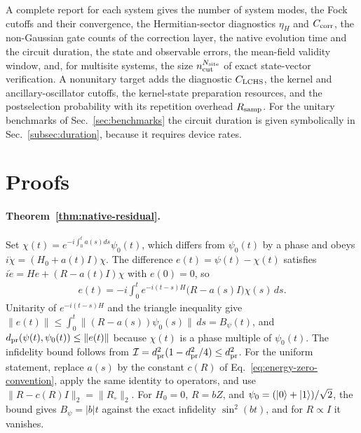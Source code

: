\documentclass[pra,twocolumn,superscriptaddress,nofootinbib,floatfix]{revtex4-2}
\theoremstyle{remark}
\newcommand{\dpr}{d_{\rm pr}}
\newcommand{\revcolor}{\color{blue}}
\DeclareRobustCommand{\rev}[1]{{\revcolor #1}}
\begin{document}
\rev{A complete report for each system gives the number of system modes, the Fock cutoffs and their convergence, the Hermitian-sector diagnostics \(\eta_H\) and \(C_{\rm corr}\), the non-Gaussian gate counts of the correction layer, the native evolution time and the circuit duration, the state and observable errors, the mean-field validity window, and, for multisite systems, the size \(n_{\rm cut}^{N_{\rm site}}\) of exact state-vector verification.} \rev{A nonunitary target adds the diagnostic \(C_{\rm LCHS}\), the kernel and ancillary-oscillator cutoffs, the kernel-state preparation resources, and the postselection probability with its repetition overhead \(R_{\rm samp}\).} \rev{For the unitary benchmarks of Sec.~\ref{sec:benchmarks} the circuit duration is given symbolically in Sec.~\ref{subsec:duration}, because it requires device rates.}

\section{\rev{Proofs}}
\label{app:proofs}

\paragraph{\rev{Theorem~\ref{thm:native-residual}.}}
\rev{Set \(\chi(t)=e^{-i\int_0^ta(s)ds}\psi_0(t)\), which differs from \(\psi_0(t)\) by a phase and obeys \(i\dot\chi=(H_0+a(t)I)\chi\).} \rev{The difference \(e(t)=\psi(t)-\chi(t)\) satisfies \(i\dot e=He+(R-a(t)I)\chi\) with \(e(0)=0\), so}
\begingroup\revcolor
\begin{align}
e(t)=-i\int_0^te^{-i(t-s)H}\big(R-a(s)I\big)\chi(s)\,ds .
\end{align}
\endgroup
\rev{Unitarity of \(e^{-i(t-s)H}\) and the triangle inequality give \(\|e(t)\|\le\int_0^t\|(R-a(s))\psi_0(s)\|\,ds=B_\psi(t)\), and \(\dpr(\psi(t),\psi_0(t))\le\|e(t)\|\) because \(\chi(t)\) is a phase multiple of \(\psi_0(t)\).} \rev{The infidelity bound follows from \(\mathcal I=\dpr^2(1-\dpr^2/4)\le\dpr^2\).} \rev{For the uniform statement, replace \(a(s)\) by the constant \(c(R)\) of Eq.~\eqref{eq:energy-zero-convention}, apply the same identity to operators, and use \(\|R-c(R)I\|_2=\|R_\circ\|_2\).} \rev{For \(H_0=0\), \(R=bZ\), and \(\psi_0=(\ket0+\ket1)/\sqrt2\), the bound gives \(B_\psi=|b|t\) against the exact infidelity \(\sin^2(bt)\), and for \(R\propto I\) it vanishes.}
\end{document}
